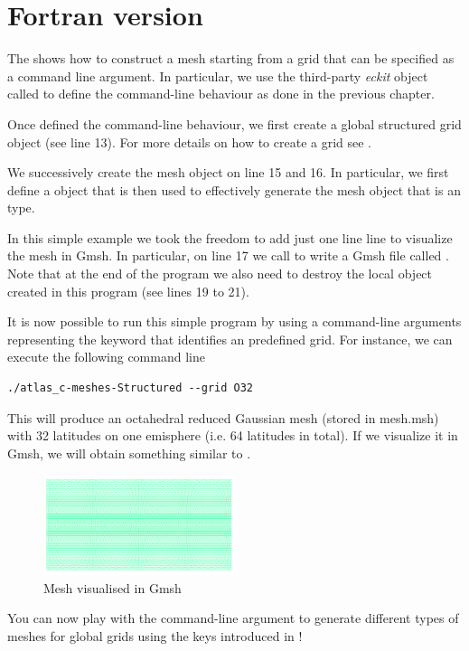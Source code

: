\section{Fortran version}
The  shows how to construct a mesh 
starting from a grid that can be specified as a command 
line argument. In particular, we use the third-party 
\textit{eckit} object called  to define 
the command-line behaviour as done in the previous chapter. 
 
%

%
Once defined the command-line behaviour, we first create 
a global structured grid object (see line 13). For more 
details on how to create a grid see .

We successively create the mesh object on line 15 and 16.
In particular, we first define a  
object that is then used to effectively generate the mesh object 
 that is an  type.

In this simple example we took the freedom to add just one line 
line to visualize the mesh in Gmsh. In particular, on line 17 
we call  to write a Gmsh file called 
. Note that at the end of the program we also 
need to destroy the local object created in this program (see 
lines 19 to 21).

It is now possible to run this simple program by using 
a command-line arguments representing the keyword that 
identifies an \Atlas predefined grid. For instance, 
we can execute the following command line
%
\begin{lstlisting}[style=BashStyle]
./atlas_c-meshes-Structured --grid O32
\end{lstlisting}
% 
This will produce an octahedral reduced Gaussian mesh 
(stored in mesh.msh) with 32 latitudes on one emisphere 
(i.e. 64 latitudes in total).
If we visualize it in Gmsh, we will obtain something similar
to .
%
\begin{figure}%
\centering
\includegraphics[width=0.5\textwidth]{imgs/O32-2D.png}
\caption{Mesh visualised in Gmsh}%
\label{fig:meshes-f}%
\end{figure}
%
You can now play with the command-line argument to generate 
different types of meshes for global grids using the keys 
introduced in !

